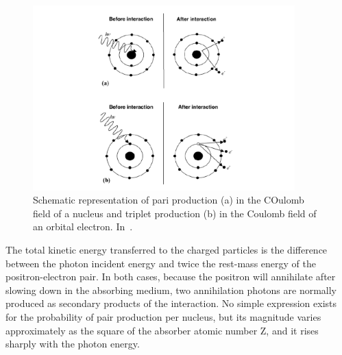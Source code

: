 \begin{figure}[!htbp]
\centering
\includegraphics[width=0.9\textwidth]{03_GraphicFiles/chapter2_GammaCameras/pairProd.pdf}
\caption{Schematic representation of pari production (a) in the COulomb field of a nucleus and triplet production (b) in the Coulomb field of an orbital electron. In~\cite{Podgorsak2010}.}
\label{chap2::fig::pairprod}
\end{figure} 

The total kinetic energy transferred to the charged particles is the difference between the photon incident energy and twice the rest-mass energy of the positron-electron pair.
In both cases, because the positron will annihilate after slowing down in the absorbing medium, two annihilation photons are normally produced as secondary products of the interaction. 
No simple expression exists for the probability of pair production per nucleus, but its magnitude varies approximately as the square of the absorber atomic number Z, and it rises sharply with the photon energy. 


